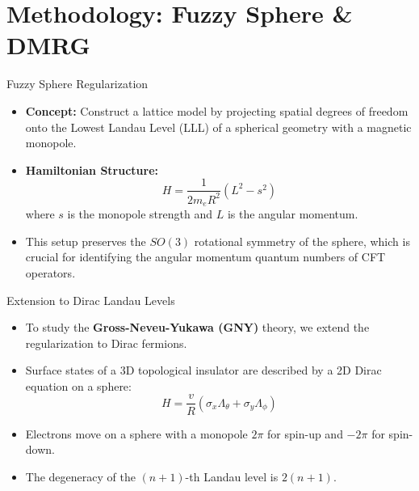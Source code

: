 \documentclass[aspectratio=169]{beamer}
\begin{document}
\section{Methodology: Fuzzy Sphere \& DMRG}
\begin{frame}{Fuzzy Sphere Regularization}
    \begin{itemize}
        \item \textbf{Concept:} Construct a lattice model by projecting spatial degrees of freedom onto the Lowest Landau Level (LLL) of a spherical geometry with a magnetic monopole.
        \item \textbf{Hamiltonian Structure:}
        \begin{equation*}
            H = \frac{1}{2m_e R^2} (L^2 - s^2)
        \end{equation*}
        where $s$ is the monopole strength and $L$ is the angular momentum.
        \item This setup preserves the $SO(3)$ rotational symmetry of the sphere, which is crucial for identifying the angular momentum quantum numbers of CFT operators.
    \end{itemize}
\end{frame}

\begin{frame}{Extension to Dirac Landau Levels}
    \begin{itemize}
        \item To study the \textbf{Gross-Neveu-Yukawa (GNY)} theory, we extend the regularization to Dirac fermions.
        \item Surface states of a 3D topological insulator are described by a 2D Dirac equation on a sphere:
        \begin{equation*}
            H = \frac{v}{R} (\sigma_x \Lambda_\theta + \sigma_y \Lambda_\phi)
        \end{equation*}
        \item Electrons move on a sphere with a monopole $2\pi$ for spin-up and $-2\pi$ for spin-down. 
        \item The degeneracy of the $(n+1)$-th Landau level is $2(n+1)$.
    \end{itemize}
\end{frame}
\end{document}
